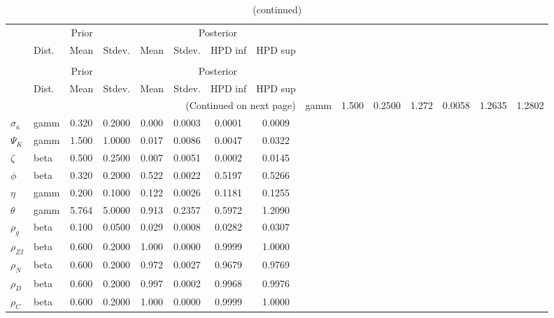  
\begin{center}
\begin{longtable}{llcccccc} 
\caption{Results from Metropolis-Hastings (parameters)}
 \label{Table:MHPosterior:1}\\
\toprule 
  & \multicolumn{3}{c}{Prior}  &  \multicolumn{4}{c}{Posterior} \\
  \cmidrule(r{.75em}){2-4} \cmidrule(r{.75em}){5-8}
  & Dist. & Mean  & Stdev. & Mean & Stdev. & HPD inf & HPD sup\\
\midrule \endfirsthead 
\caption{(continued)}\\\toprule 
  & \multicolumn{3}{c}{Prior}  &  \multicolumn{4}{c}{Posterior} \\
  \cmidrule(r{.75em}){2-4} \cmidrule(r{.75em}){5-8}
  & Dist. & Mean  & Stdev. & Mean & Stdev. & HPD inf & HPD sup\\
\midrule \endhead 
\bottomrule \multicolumn{8}{r}{(Continued on next page)} \endfoot 
\bottomrule \endlastfoot 
${\gamma}$ & gamm &   1.500 & 0.2500 &   1.272& 0.0058 &  1.2635 &  1.2802 \\ 
${\sigma_a}$ & gamm &   0.320 & 0.2000 &   0.000& 0.0003 &  0.0001 &  0.0009 \\ 
${\Psi_K}$ & gamm &   1.500 & 1.0000 &   0.017& 0.0086 &  0.0047 &  0.0322 \\ 
${\zeta}$ & beta &   0.500 & 0.2500 &   0.007& 0.0051 &  0.0002 &  0.0145 \\ 
${\phi}$ & beta &   0.320 & 0.2000 &   0.522& 0.0022 &  0.5197 &  0.5266 \\ 
${\eta}$ & gamm &   0.200 & 0.1000 &   0.122& 0.0026 &  0.1181 &  0.1255 \\ 
${\theta}$ & gamm &   5.764 & 5.0000 &   0.913& 0.2357 &  0.5972 &  1.2090 \\ 
${\rho_g}$ & beta &   0.100 & 0.0500 &   0.029& 0.0008 &  0.0282 &  0.0307 \\ 
${\rho_{ZI}}$ & beta &   0.600 & 0.2000 &   1.000& 0.0000 &  0.9999 &  1.0000 \\ 
${\rho_N}$ & beta &   0.600 & 0.2000 &   0.972& 0.0027 &  0.9679 &  0.9769 \\ 
${\rho_D}$ & beta &   0.600 & 0.2000 &   0.997& 0.0002 &  0.9968 &  0.9976 \\ 
${\rho_C}$ & beta &   0.600 & 0.2000 &   1.000& 0.0000 &  0.9999 &  1.0000 \\ 
\end{longtable}
 \end{center}
